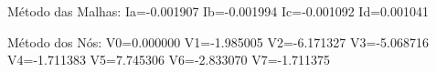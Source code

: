 Método das Malhas: 
Ia=-0.001907 
Ib=-0.001994 
Ic=-0.001092 
Id=0.001041 

Método dos Nós: 
V0=0.000000 
V1=-1.985005 
V2=-6.171327 
V3=-5.068716 
V4=-1.711383 
V5=7.745306 
V6=-2.833070 
V7=-1.711375